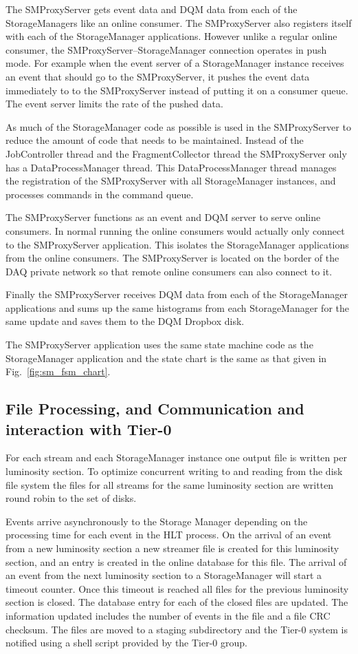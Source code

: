 The SMProxyServer gets event data and DQM data from each of the StorageManagers
like an online consumer. The SMProxyServer also
registers itself with each of the StorageManager applications. However unlike
a regular online consumer, the SMProxyServer--StorageManager connection
operates in push mode. For example when the event server of a StorageManager
instance receives an event that should go to the SMProxyServer, it pushes the
event data immediately to to the SMProxyServer instead of putting it on a
consumer queue. The event server limits the rate of the pushed data.

As much of the StorageManager code as possible is used in the
SMProxyServer to reduce the amount of code that needs to be maintained.
Instead of the JobController thread and the FragmentCollector thread the
SMProxyServer only has a DataProcessManager thread. This DataProcessManager
thread manages the registration of the SMProxyServer with all StorageManager
instances, and processes commands in the command queue.

The SMProxyServer functions as an event and DQM server to serve online consumers.
In normal running the online consumers would actually only connect to the
SMProxyServer application. This isolates the StorageManager applications from
the online consumers. The SMProxyServer is located on the border of the
DAQ private network so that remote online consumers can also connect to it.

Finally the SMProxyServer receives DQM data from each of the StorageManager
applications and sums up the same histograms from each StorageManager
for the same update and saves them to the DQM Dropbox disk.

The SMProxyServer application uses the same state machine code as the 
StorageManager application and the state chart is the same as that given
in Fig.~\ref{fig:sm_fsm_chart}.


\subsection{File Processing, and Communication and interaction with Tier-0}

For each stream and each StorageManager instance one output file is written
per luminosity section. To optimize concurrent writing to and reading from the
disk file system the files for all streams for the same luminosity section are
written round robin to the set of disks.

Events arrive asynchronously to the Storage Manager depending on the processing
time for each event in the HLT process. On the arrival of an event from a
new luminosity section a new streamer file is created for this luminosity section,
and an entry is created in the online database for this file. 
The arrival of an event from the next
luminosity section to a StorageManager will start a timeout counter. Once this
timeout is reached all files for the previous luminosity section is closed.
The database entry for each of the closed files are updated. The information
updated includes the number of events in the file and a file CRC checksum.
The files are moved to a staging subdirectory and the Tier-0 system is notified
using a shell script provided by the Tier-0 group.


